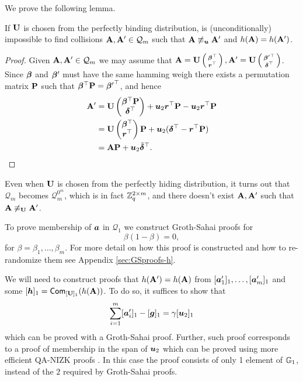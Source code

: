 We prove the following lemma.
\begin{lemma}
If $\mathbf{{U}}$ is chosen from the perfectly binding distribution, is (unconditionally) impossible to find collisions $\mathbf{{A}},\mathbf{{A}}'\in\mathcal{Q}_m$ such that $\mathbf{{A}}\not\equiv_{\boldsymbol{u}}\mathbf{{A}}'$ and $h(\mathbf{{A}})=h(\mathbf{{A}}')$.
\end{lemma}
\begin{proof}
Given $\mathbf{{A}},\mathbf{{A}}'\in\mathcal{Q}_m$ we may assume that $\mathbf{{A}}=\mathbf{{U}}\left(\begin{smallmatrix}{\boldsymbol{\beta}}^\top\\{\boldsymbol{r}}^\top\end{smallmatrix}\right),\mathbf{{A}}'=\mathbf{{U}}\left(\begin{smallmatrix}{{\boldsymbol{\beta}}'}^\top\\{\boldsymbol{\delta}}^\top\end{smallmatrix}\right)$. Since ${\boldsymbol{\beta}}$ and ${\boldsymbol{\beta}}'$ must have the same hamming weigh there exists a permutation matrix $\mathbf{{P}}$ such that ${\boldsymbol{\beta}}^\top\mathbf{{P}} = {{\boldsymbol{\beta}}'}^\top$, and hence
\begin{align*}
\mathbf{{A}}' &= \mathbf{{U}}\left(\begin{matrix}{\boldsymbol{\beta}}^\top\mathbf{{P}}\\{\boldsymbol{\delta}}^\top\end{matrix}\right)+ {\boldsymbol{u}}_2{\boldsymbol{r}}^\top\mathbf{{P}} - {\boldsymbol{u}}_2{\boldsymbol{r}}^\top\mathbf{{P}}\\
&=
\mathbf{{U}} \left(\begin{matrix}{\boldsymbol{\beta}}^\top\\{\boldsymbol{r}}^\top\end{matrix}\right)\mathbf{{P}} + {\boldsymbol{u}}_2({\boldsymbol{\delta}}^\top-{\boldsymbol{r}}^\top\mathbf{{P}})\\
 &=
 \mathbf{{A}}\mathbf{{P}} + {\boldsymbol{u}}_2\tilde{{\boldsymbol{\delta}}}^\top.
\end{align*}
\end{proof}

Even 
when $\mathbf{{U}}$ is chosen from the perfectly hiding distribution, it turns out that $\mathcal{Q}_m$ becomes $\mathcal{Q}_m^{0^m}$, which is in fact $\mathbb{Z}_q^{2\times m}$, and there doesn't exist $\mathbf{{A}},\mathbf{{A}}'$ such that $\mathbf{{A}}\not\equiv_{\mathbf{{U}}}\mathbf{{A}}'$. 

To prove membership of ${\boldsymbol{a}}$ in $\mathcal{Q}_1$ we construct Groth-Sahai proofs for
\begin{equation}
\beta(1-\beta)=0 \label{eq:Qm-memb},
\end{equation}
for $\beta=\beta_1,\ldots,\beta_m$. For more detail on how this proof is constructed and how to re-randomize them see Appendix \ref{sec:GSproofs-h}.

We will need to construct proofs that $h(\mathbf{{A}}') = h(\mathbf{{A}})$ from $[{\boldsymbol{a}}'_1]_1,\ldots,[{\boldsymbol{a}}'_m]_1$ and some $[{\boldsymbol{h}}]_1 = \mathsf{Com}_{[\mathbf{{U}}]_1}(h(\mathbf{{A}}))$. To do so, it suffices to show that
\begin{equation}
\sum_{i=1}^{m}[{\boldsymbol{a}}'_i]_1 - [{\boldsymbol{g}}]_1 = \gamma[{\boldsymbol{u}}_2]_1
\label{eq:coll-h}
\end{equation}
which can be proved with a Groth-Sahai proof. Further, such proof corresponds to a proof of membership in the span of ${\boldsymbol{u}}_2$ which can be proved using more efficient QA-NIZK proofs \cite{C:JutRoy14,EC:KilWee15}. In this case the proof consists of only 1 element of $\mathbb{G}_1$, instead of the $2$ required by Groth-Sahai proofs.

